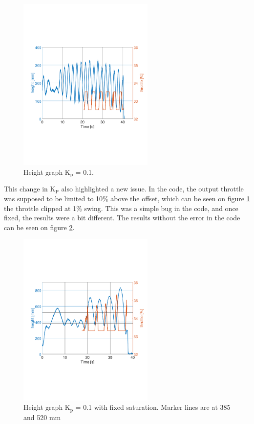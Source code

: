 \begin{figure}[H]
    \centering
    \includegraphics[width=0.6\textwidth, trim={0 7cm 0 7cm},clip]{figures/Appendix/final_test/kp0,1.pdf}
    \caption{Height graph K$_\text{p}$ = 0.1.}
    \label{fig:third_test_report}
\end{figure}

This change in K$_\text{P}$ also highlighted a new issue. In the code, the output throttle was supposed to be limited to 10\% above the offset, which can be seen on figure \ref{fig:third_test_report} the throttle clipped at 1\% swing. This was a simple bug in the code, and once fixed, the results were a bit different. The results without the error in the code can be seen on figure \ref{fig:fourth_test_report}.

\begin{figure}[H]
    \centering
    \includegraphics[width=0.6\textwidth, trim={0 7cm 0 7cm},clip]{figures/Appendix/final_test/kp0,1fix.pdf}
    \caption{Height graph K$_\text{p}$ = 0.1 with fixed saturation. Marker lines are at 385 and 520 mm}
    \label{fig:fourth_test_report}
\end{figure}

